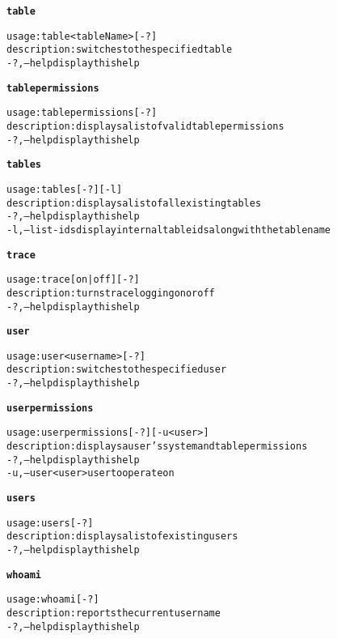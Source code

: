 \begin{alltt}
\textbf{table}

    usage: table <tableName> [-?]
    description: switches to the specified table
      -?,--help  display this help

\textbf{tablepermissions}

    usage: tablepermissions [-?]
    description: displays a list of valid table permissions
      -?,--help  display this help

\textbf{tables}

    usage: tables [-?] [-l]
    description: displays a list of all existing tables
      -?,--help  display this help
      -l,--list-ids  display internal table ids along with the table name

\textbf{trace}

    usage: trace [ on | off ] [-?]
    description: turns trace logging on or off
      -?,--help  display this help

\textbf{user}

    usage: user <username> [-?]
    description: switches to the specified user
      -?,--help  display this help

\textbf{userpermissions}

    usage: userpermissions [-?] [-u <user>]
    description: displays a user's system and table permissions
      -?,--help  display this help
      -u,--user <user>  user to operate on

\textbf{users}

    usage: users [-?]
    description: displays a list of existing users
      -?,--help  display this help

\textbf{whoami}

    usage: whoami [-?]
    description: reports the current user name
      -?,--help  display this help

\end{alltt}
